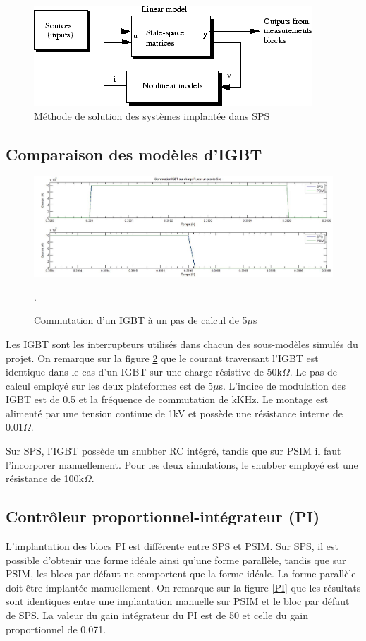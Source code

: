 \begin{figure}
\centering
\includegraphics[scale=0.7]{Fig/Comp/improving_performance5.png}
\caption{Méthode de solution des systèmes implantée dans SPS}
\label{fig_solving_SPS}
\end{figure}

\subsection{Comparaison des modèles d'IGBT}

\begin{figure}[htb]
\centering
\includegraphics[scale=0.5]{fig/Comp/IGBT.jpg}
\caption{Commutation d'un IGBT à un pas de calcul de 5$\mu$s}.
\label{IG}
\end{figure}

Les IGBT sont les interrupteurs utilisés dans chacun des sous-modèles simulés du projet. On remarque sur la figure \ref{IG} que le  courant traversant l'IGBT est identique dans le cas d'un IGBT sur une charge résistive de 50k$\Omega$. Le pas de calcul employé sur les deux plateformes est de 5$\mu$s. L'indice de modulation des IGBT est de 0.5 et la fréquence de commutation de kKHz. Le montage est alimenté par une tension continue de 1kV et possède une résistance interne de 0.01$\Omega$. 

Sur SPS, l'IGBT possède un snubber RC intégré, tandis que sur PSIM il faut l'incorporer manuellement. Pour les deux simulations, le snubber employé est une résistance de 100k$\Omega$.
 
\subsection{Contrôleur proportionnel-intégrateur (PI)}
L'implantation des blocs PI est différente entre SPS et PSIM. Sur SPS, il est possible d'obtenir une forme idéale ainsi qu'une forme parallèle, tandis que sur PSIM, les blocs par défaut ne comportent que la forme idéale. La forme parallèle doit être implantée manuellement. On remarque sur la figure \ref{PI} que les résultats sont identiques entre une implantation manuelle sur PSIM et le bloc par défaut de SPS. La valeur du gain intégrateur du PI est de 50 et celle du gain proportionnel de 0.071. 

